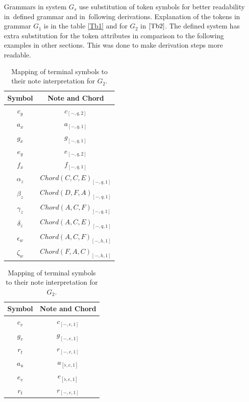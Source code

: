 Grammars in system $G_{s}$ use substitution of token symbols for better readability in~defined grammar and in~following derivations. Explanation of the tokens in grammar $G_1$ is in the table \ref{Tb1} and for $G_2$ in $\ref{Tb2}$. The defined system has extra substitution for the token attributes in comparison to the following examples in other sections. This was done to make derivation steps more readable.
\begin{table}[h]
\centering
\begin{minipage}{0.48\textwidth}
\centering
\begin{tabular}{c|c}
Symbol & Note and Chord \\
\hline
$c_y$ & $c_{[-, q, 2]}$ \\
$a_x$ & $a_{[-, q, 1]}$ \\
$g_x$ & $g_{[-, q, 1]}$ \\
$e_y$ & $e_{[-, q, 2]}$ \\
$f_x$ & $f_{[-, q, 1]}$ \\
$\alpha_{z}$ & $Chord(C,C,E)_{[-, q, 1]}$ \\
$\beta_{z}$ & $Chord(D,F,A)_{[-, q, 1]}$ \\
$\gamma_{z}$ & $Chord(A,C,F)_{[-, q, 1]}$ \\
$\delta_{z}$ & $Chord(A,C,E)_{[-, q, 1]}$ \\
$\epsilon_{w}$ & $Chord(A,C,F)_{[-, h, 1]}$ \\
$\zeta_{w}$ & $Chord(F,A,C)_{[-, h, 1]}$ \\
\end{tabular}
\caption{Mapping of terminal symbols to their note interpretation for $G_1$.}
\label{Tb1}
\end{minipage}
\hfill
\begin{minipage}{0.48\textwidth}
\centering
\begin{tabular}{c|c}
Symbol & Note and Chord \\
\hline
$c_{v}$ & $c_{[-, e, 1]}$ \\
$g_{v}$ & $g_{[-, e, 1]}$ \\
$r_{t}$ & $r_{[-, e, 1]}$ \\
$a_{u}$ & $a_{[\flat, e, 1]}$ \\
$e_{v}$ & $e_{[\flat, e, 1]}$ \\
$r_{t}$ & $r_{[-, e, 1]}$ \\
\end{tabular}
\caption{Mapping of terminal symbols to their note interpretation for $G_2$.}
\label{Tb2}
\end{minipage}
\end{table}

